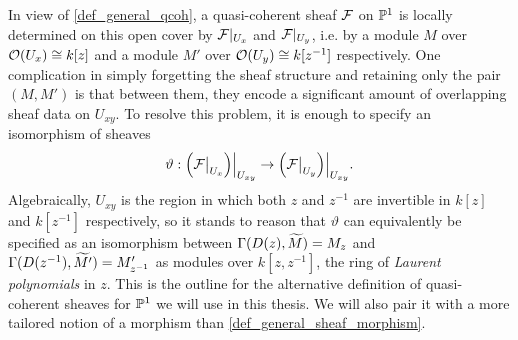 In view of \cref{def_general_qcoh}, a quasi-coherent sheaf $\mathcal{F}$
on $\mathbb{P}^{{1}}$ is locally determined on this open cover by
$\mathcal{F}|_{U_x}$ and $\mathcal{F}|_{U_y}$, i.e. by a module $M$ over
$\mathcal{O}(U_x) \cong k[z]$ and a module $M'$ over $\mathcal{O}(U_y) \cong
k[z^{-1}]$ respectively.
One complication in simply forgetting the sheaf structure and
retaining only the pair $(M, M')$ is that between them, they encode a
significant amount of overlapping sheaf data on $U_{xy}$.
To resolve this problem, it is enough to specify an isomorphism of sheaves
\[
  \vartheta:
  \setres{\left(\setres{\shf{F}}{U_x}\right)}{U_{xy}}
  \to
  \setres{\left(\setres{\shf{F}}{U_y}\right)}{U_{xy}}.
\]
Algebraically, $U_{xy}$ is the region in which both $z$ and $z^{-1}$
are invertible in $k[z]$ and $k[z^{-1}]$ respectively, so it stands
to reason that $\vartheta$ can equivalently be specified as an
isomorphism between $\Gamma({D(z)}, {\widetilde{{M}}}) = M_z$ and
$\Gamma({D(z^{-1})}, {\widetilde{{M'}}}) = M'_{z^{-1}}$ as modules over
$k[z, z^{-1}]$, the ring of \emph{Laurent polynomials} in $z$.
This is the outline for the alternative definition of quasi-coherent
sheaves for $\mathbb{P}^{{1}}$ we will use in this thesis.
We will also pair it with a more tailored notion of a morphism than
\cref{def_general_sheaf_morphism}.



